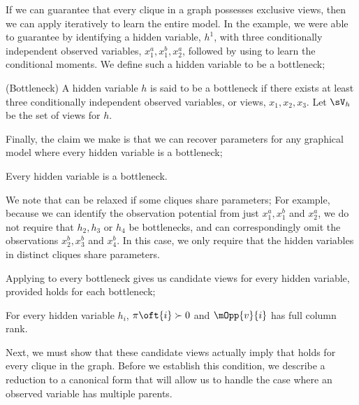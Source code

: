 If we can guarantee that every clique in a graph possesses exclusive
  views, then we can apply \LearnClique iteratively to learn the entire
  model.
In the example, we were able to guarantee 
  by identifying a hidden variable, $h^1$, with three conditionally
  independent observed variables, $x^a_1, x^b_1, x^a_2$, followed by
  using \TensorFactorize to learn the conditional moments.
We define such a hidden variable to be a bottleneck;
\begin{definition}(Bottleneck)
  A hidden variable $h$ is said to be a bottleneck if there exists at
    least three conditionally independent observed variables, or views,
    $x_1, x_2, x_3$. 
  Let $\sV_{h}$ be the set of views for $h$.
\end{definition}
Finally, the claim we make is that we can recover parameters for any
  graphical model where every hidden variable is a bottleneck;
\begin{property}
  \label{prop:bottleneck}
  Every hidden variable is a bottleneck.
\end{property}
We note that  can be relaxed if some cliques
  share parameters;
For example, because we can identify the observation potential from just
  $x^a_1, x^b_1$ and $x^a_2$, we do not require that $h_2, h_3$ or $h_4$
  be bottlenecks, and can correspondingly omit the observations $x^b_2,
  x^b_3$ and $x^b_4$.
In this case, we only require that the hidden variables in distinct
  cliques share parameters.

Applying \TensorFactorize to every bottleneck gives us candidate views
  for every hidden variable, provided  holds for each bottleneck;
\begin{assumption} 
  \label{asm:full-rank-plus}
  For every hidden variable $h_i$, $\pi\oft{i} \succ 0$ and
    $\mOpp{v}{i}$ has full column rank.
\end{assumption}
  
Next, we must show that these candidate views actually imply that
   holds for every clique in the graph.
Before we establish this condition, we describe a reduction to
  a canonical form that will allow us to handle the case where an observed
  variable has multiple parents.

